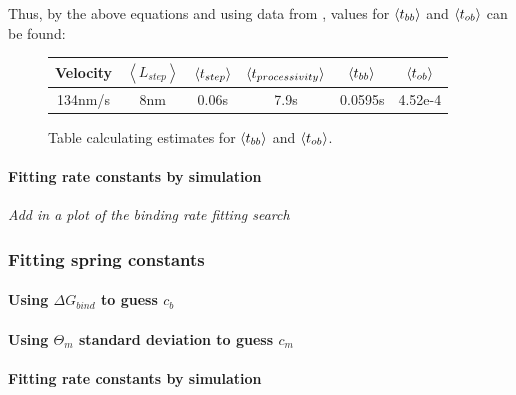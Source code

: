 \documentclass[10pt]{article} %
\begin{document}
Thus, by the above equations and using data from \cite{weihongpaper}, values for $\left<t_{bb}\right>$ and $\left<t_{ob}\right>$ can be found:

\begin{figure}[h]
  \centering
  \begin{tabular}{| c | c | c | c | c | c |}
    \hline
    Velocity & $\left<L_{step}\right>$ & $\left<t_{step}\right>$ & $\left<t_{processivity}\right>$ & $\left<t_{bb}\right>$ & $\left<t_{ob}\right>$ \\ \hline
    134nm/s & 8nm & 0.06s & 7.9s & 0.0595s & 4.52e-4\\ \hline
  \end{tabular}
  \caption{Table calculating estimates for $\left<t_{bb}\right>$ and $\left<t_{ob}\right>$.}
  \label{table:parameter-table}
\end{figure}


\paragraph{Fitting rate constants by simulation}
\textit{Add in a plot of the binding rate fitting search}

\subsubsection{Fitting spring constants}
\paragraph{Using $\Delta G_{bind}$ to guess $c_b$}
\paragraph{Using $\Theta_m$ standard deviation to guess $c_m$}
\paragraph{Fitting rate constants by simulation}

\end{document}
